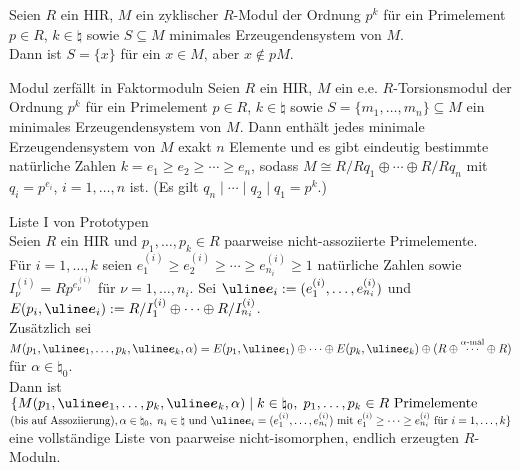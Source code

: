 \begin{Kor}
    Seien $R$ ein HIR, $M$ ein zyklischer $R$-Modul der Ordnung $p^k$ für
    ein Primelement $p \in R$, $k \in \natural$ sowie $S \subseteq M$
    minimales Erzeugendensystem von $M$. \\
    Dann ist $S = \{x\}$ für ein $x \in M$, aber $x \notin pM$.
\end{Kor}

\begin{Satz}{Modul zerfällt in Faktormoduln}
    Seien $R$ ein HIR, $M$ ein e.e. $R$-Torsionsmodul der Ordnung $p^k$ für
    ein Primelement $p \in R$, $k \in \natural$ sowie
    $S = \{m_1, \dotsc, m_n\} \subseteq M$ ein minimales
    Erzeugendensystem von $M$.
    Dann enthält jedes minimale Erzeugendensystem von $M$ exakt $n$ Elemente
    und es gibt eindeutig bestimmte natürliche Zahlen
    $k = e_1 \ge e_2 \ge \dotsb \ge e_n$, sodass
    $M \cong R/Rq_1 \oplus \dotsb \oplus R/Rq_n$ mit $q_i = p^{e_i}$,
    $i = 1, \dotsc, n$ ist.
    (Es gilt $q_n \;|\; \dotsb \;|\; q_2 \;|\; q_1 = p^k$.)
\end{Satz}

\begin{Satz}{Liste I von Prototypen} \\
    Seien $R$ ein HIR und $p_1, \dotsc, p_k \in R$ paarweise nicht-assoziierte
    Primelemente. \\
    Für $i = 1, \dotsc, k$ seien
    $e_1^{(i)} \ge e_2^{(i)} \ge \dotsb \ge e_{n_i}^{(i)} \ge 1$ natürliche
    Zahlen sowie $I_\nu^{(i)} = Rp^{e_\nu^{(i)}}$ für $\nu = 1, \dotsc, n_i$.
    Sei $\mi{e}_i := (e_1^{(i)}, \dotsc, e_{n_i}^{(i)})$ und
    $E(p_i, \mi{e}_i) := R/I_1^{(i)} \oplus \dotsb \oplus R/I_{n_i}^{(i)}$. \\
    Zusätzlich sei
    $M(p_1, \mi{e}_1, \dotsc, p_k, \mi{e}_k, \alpha) =
    E(p_1, \mi{e}_1) \oplus \dotsb \oplus E(p_k, \mi{e}_k) \oplus
    (R \oplus \overset{\alpha\text{-mal}}{\dotsb} \oplus R)$
    für $\alpha \in \natural_0$. \\
    Dann ist
    $\{M(p_1, \mi{e}_1, \dotsc, p_k, \mi{e}_k, \alpha) \;|\;
    k \in \natural_0,\;
    p_1, \dotsc, p_k \in R \text{ Primelemente}$\\
    $\text{(bis auf Assoziierung)},
    \alpha \in \natural_0,\;
    n_i \in \natural \text{ und }
    \mi{e}_i = (e_1^{(i)}, \dotsc, e_{n_i}^{(i)}) \text{ mit }
    e_1^{(i)} \ge \dotsb \ge e_{n_i}^{(i)} \text{ für } i = 1, \dotsc, k\}$
    eine vollständige Liste von paarweise nicht-isomorphen, endlich erzeugten
    $R$-Moduln.
\end{Satz}

